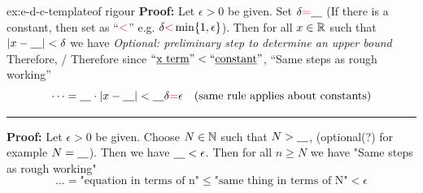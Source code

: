 \documentclass[landscape, 8pt]{extarticle}
\begin{document}
\begin{multicols}{3}
\begin{xmp}{ex:e-d-c-template}{of rigour}
    \textbf{Proof:} Let $\epsilon > 0$ be given. Set $\delta {\color{colour1}=}\text{\underline{\quad}}$ (If there is a constant, then set as ``${\color{colour1}<}$'' e.g. $\delta {\color{colour1}<}\min\{1,\epsilon\}$). Then for all $x\in \mathbb{R}$ such that $\lvert x - \text{\underline{\quad}}\rvert < \delta$ we have
    \vspace{0pt}\newline
    \textit{Optional: preliminary step to determine an upper bound}
    \vspace{0pt}\newline
    Therefore, / Therefore since $\text{``\underline{x term}''} < \text{``\underline{constant}''}$,
    \vspace{0pt}\newline
    ``Same steps as rough working''
    \[\dots = \text{\underline{\quad}} \cdot \lvert x - \text{\underline{\quad}}\rvert < \text{\underline{\quad}}\delta {\color{colour1}=} \epsilon \quad\text{(same rule applies about constants)}\]
    \hrule
    \vspace{3pt}
    \noindent\textbf{Proof:} Let $\epsilon>0$ be given. Choose $N\in \mathbb{N}$ such that $N > \text{\underline{\quad}}$, (optional(?) for example $N=\text{\underline{\quad}}$). Then we have $\text{\underline{\quad}}<\epsilon$. Then for all $n\ge N$ we have
    \vspace{0pt}\newline
    "Same steps as rough working"
    \[\dots = \text{"equation in terms of n"} \le \text{"same thing in terms of N"} < \epsilon\]
\end{xmp}
\vspace{-5pt}


\end{multicols}
\end{document}
